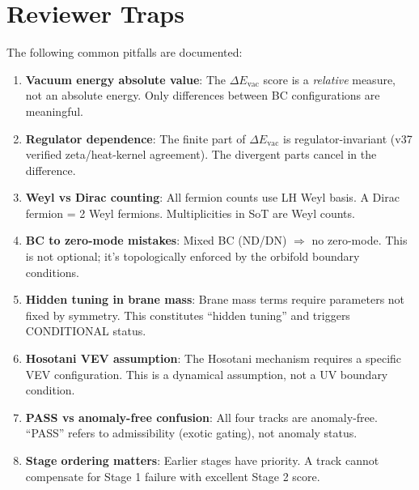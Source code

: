 \documentclass[11pt,a4paper]{article}
\begin{document}
\section{Reviewer Traps}
\label{sec:traps}

The following common pitfalls are documented:

\begin{enumerate}[label=\textbf{Trap \arabic*}, leftmargin=*]

\item \textbf{Vacuum energy absolute value}:
The $\Delta E_{\text{vac}}$ score is a \emph{relative} measure, not an absolute energy.
Only differences between BC configurations are meaningful.

\item \textbf{Regulator dependence}:
The finite part of $\Delta E_{\text{vac}}$ is regulator-invariant (v37 verified zeta/heat-kernel
agreement). The divergent parts cancel in the difference.

\item \textbf{Weyl vs Dirac counting}:
All fermion counts use LH Weyl basis. A Dirac fermion = 2 Weyl fermions.
Multiplicities in SoT are Weyl counts.

\item \textbf{BC to zero-mode mistakes}:
Mixed BC (ND/DN) $\Rightarrow$ no zero-mode. This is not optional; it's
topologically enforced by the orbifold boundary conditions.

\item \textbf{Hidden tuning in brane mass}:
Brane mass terms require parameters not fixed by symmetry. This constitutes
``hidden tuning'' and triggers CONDITIONAL status.

\item \textbf{Hosotani VEV assumption}:
The Hosotani mechanism requires a specific VEV configuration. This is a
dynamical assumption, not a UV boundary condition.

\item \textbf{PASS vs anomaly-free confusion}:
All four tracks are anomaly-free. ``PASS'' refers to admissibility (exotic gating),
not anomaly status.

\item \textbf{Stage ordering matters}:
Earlier stages have priority. A track cannot compensate for Stage 1 failure
with excellent Stage 2 score.


\end{enumerate}
\end{document}
